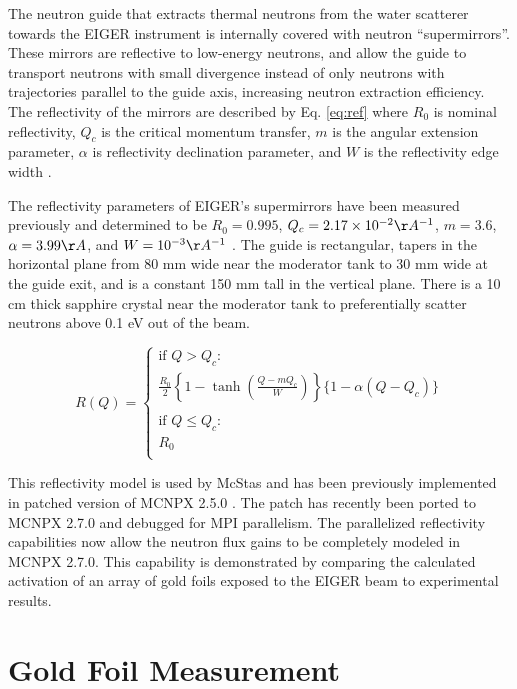 \documentclass[a4paper,
              ]{jacow}
\begin{document}
The neutron guide that extracts thermal neutrons from the water scatterer towards the EIGER instrument is internally covered with neutron ``supermirrors''.  These mirrors are reflective to low-energy neutrons, and allow the guide to transport neutrons with small divergence instead of only neutrons with trajectories parallel to the guide axis, increasing neutron extraction efficiency.  The reflectivity of the mirrors are described by Eq. \ref{eq:ref} where $R_0$ is nominal reflectivity, $Q_c$ is the critical momentum transfer, $m$ is the angular extension parameter, $\alpha$ is reflectivity declination parameter, and $W$ is the reflectivity edge width \cite{mcnpx-ref}.

The reflectivity parameters of EIGER's supermirrors have been measured previously and determined to be $R_0=0.995$, $Q_c=2.17\times10^{-2}\AA^{-1}$, $m=3.6$, $\alpha=3.99 \AA$, and $W=10^{-3} \AA^{-1}$ \cite{eiger-uwe}.  The guide is rectangular, tapers in the horizontal plane from 80 mm wide near the moderator tank to 30 mm wide at the guide exit, and is a constant 150 mm tall in the vertical plane.  There is a 10 cm thick sapphire crystal near the moderator tank to preferentially scatter neutrons above 0.1 eV out of the beam.

\begin{equation}\label{eq:ref}
R(Q) = 
\begin{cases}
    \mbox{if } Q > Q_c : \\
    \frac{R_0}{2}\left\{  1 - \tanh\left(  \frac{Q - m Q_c}{W}\right) \right\}\{1-\alpha(Q-Q_c)\} \\
    \\
    \mbox{if } Q \leq Q_c :\\
    R_0 \\
\end{cases}
\end{equation}

This reflectivity model is used by McStas and has been previously implemented in patched version of MCNPX 2.5.0 \cite{mcnpx-ref}.  The patch has recently been ported to MCNPX 2.7.0 \cite{mcnpx270} and debugged for MPI parallelism.  The parallelized reflectivity capabilities now allow the neutron flux gains to be completely modeled in MCNPX 2.7.0.  This capability is demonstrated by comparing the calculated activation of an array of gold foils exposed to the EIGER beam to experimental results.

\section{Gold Foil Measurement}
\end{document}
